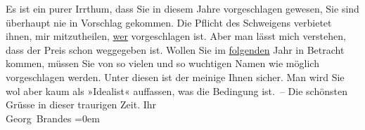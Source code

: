 \begin{ledgroupsized}[t]{13cm}
           \pstart
           Es ist ein purer Irrthum, dass Sie in diesem Jahre vorgeschlagen gewesen, Sie sind
               überhaupt nie in Vorschlag gekommen. Die Pflicht des Schweigens verbietet ihnen, mir
               mitzutheilen, \uline{wer} vorgeschlagen ist. Aber man lässt
               mich verstehen, dass der Preis schon weggegeben ist.\pend
           \pstart
           Wollen Sie im \uline{folgenden} Jahr in Betracht kommen,
               müssen Sie  von so vielen und so wuchtigen
               Namen wie möglich vorgeschlagen werden. Unter diesen ist der meinige Ihnen sicher.
               Man wird Sie wol aber kaum als »Idealist« auffassen, was die Bedingung ist. – Die
               schönsten Grüsse in dieser traurigen Zeit.\pend
           \pstart
           Ihr{\\[\baselineskip]}\spacefill\mbox{Georg Brandes}\pend
           \leftskip=0em{}
         
         \endnumbering{}\end{ledgroupsized}  \newcommand{\dateiname}{L02198}\newcommand{\titel}{Georg Brandes an Arthur Schnitzler, 18. 10. 1914}\newcommand{\editorInnen}{Martin Anton Müller und Gerd-Hermann Susen}
      